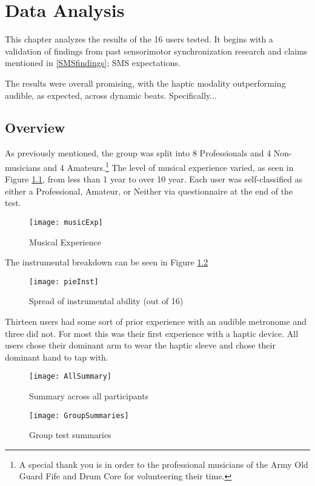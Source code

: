 \chapter{Data Analysis} \label{DataAnalysis}
This chapter analyzes the results of the 16 users tested. It begins with a validation of findings from past sensorimotor synchronization research and claims mentioned in \ref{SMSfindings}; SMS expectations. 

The results were overall promising, with the haptic modality outperforming audible, as expected, across dynamic beats. Specifically...

\section{Overview}
As previously mentioned, the group was split into 8 Professionals and 4 Non-musicians and 4 Amateurs.\footnote{A special thank you is in order to the professional musicians of the Army Old Guard Fife and Drum Core for volunteering their time.} The level of musical experience varied, as seen in Figure \ref{fig:musicExp}, from less than 1 year to over 10 year. Each user was self-classified as either a Professional, Amateur, or Neither via questionnaire at the end of the test.

\begin{figure}[H]\label{fig:musicExp}
    \centering
    \texttt{[image: musicExp]}
    \caption{Musical Experience}
\end{figure}

The instrumental breakdown can be seen in Figure \ref{fig:pieInst}
\begin{figure}[H]\label{fig:pieInst}
    \centering
    \texttt{[image: pieInst]}
    \caption{Spread of instrumental ability (out of 16)}
\end{figure}

Thirteen users had some sort of prior experience with an audible metronome and three did not. For most this was their first experience with a haptic device. All users chose their dominant arm to wear the haptic sleeve and chose their dominant hand to tap with.

\begin{figure}[H]
    \centering
    \texttt{[image: AllSummary]}
    \caption{Summary across all participants}
    \label{fig:AllSummary}
\end{figure}

\begin{figure}[H]
    \centering
    \texttt{[image: GroupSummaries]}
    \caption{Group test summaries}
    \label{fig:GroupSummaries}
\end{figure}

